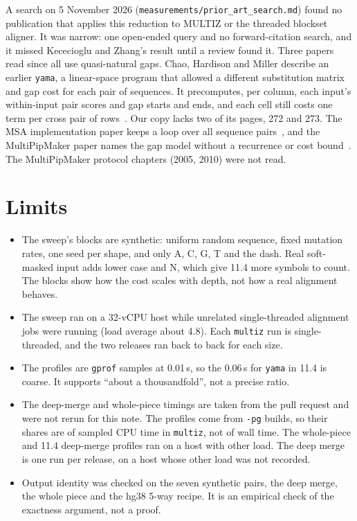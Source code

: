 \documentclass[11pt,letterpaper]{article}
\newcommand{\code}[1]{\texttt{#1}}
\begin{document}
A search on 5 November 2026 (\code{measurements/prior\_art\_search.md}) found no publication that applies this
reduction to MULTIZ or the threaded blockset aligner. It was narrow: one open-ended query and no forward-citation
search, and it missed Kececioglu and Zhang's result until a review found it. Three papers read since all use
quasi-natural gaps. Chao, Hardison and Miller describe an earlier \code{yama}, a linear-space program that allowed a
different substitution matrix and gap cost for each pair of sequences. It precomputes, per column, each input's
within-input pair scores and gap starts and ends, and each cell still costs one term per cross pair of
rows~\cite{chao1994}.
Our copy lacks two of its pages, 272 and 273. The MSA implementation paper keeps a loop over all sequence
pairs~\cite{gupta1995}, and the MultiPipMaker paper names the gap model without a recurrence or cost
bound~\cite{schwartz2003}. The MultiPipMaker protocol chapters (2005, 2010) were not read.

\section{Limits}

\begin{itemize}
\item The sweep's blocks are synthetic: uniform random sequence, fixed mutation rates, one seed per shape, and
  only A, C, G, T and the dash. Real soft-masked input adds lower case and N, which give 11.4 more symbols to count.
  The blocks show how the cost scales with depth, not how a real alignment behaves.
\item The sweep ran on a 32-vCPU host while unrelated single-threaded alignment jobs were running (load average
  about 4.8). Each \code{multiz} run is single-threaded, and the two releases ran back to back for each size.
\item The profiles are \code{gprof} samples at 0.01\,s, so the 0.06\,s for \code{yama} in 11.4 is coarse. It
  supports ``about a thousandfold'', not a precise ratio.
\item The deep-merge and whole-piece timings are taken from the pull request and were not rerun for this note. The
  profiles come from \code{-pg} builds, so their shares are of sampled CPU time in \code{multiz}, not of wall time.
  The whole-piece and 11.4 deep-merge profiles ran on a host with other load. The
  deep merge is one run per release, on a host whose other load was not recorded.
\item Output identity was checked on the seven synthetic pairs, the deep merge, the whole piece and the hg38 5-way
  recipe. It is an empirical check of the exactness argument, not a proof.
\end{itemize}
\end{document}
